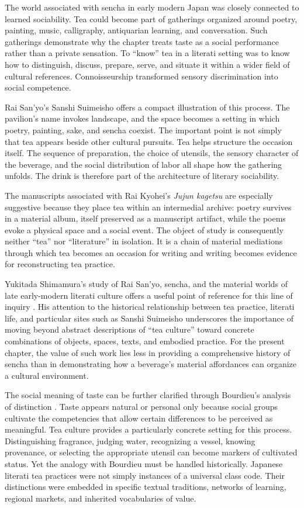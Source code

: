 \documentclass[numbers]{IntechOpen-Book}
\begin{document}
The world associated with sencha in early modern Japan was closely connected to learned sociability. Tea could become part of gatherings organized around poetry, painting, music, calligraphy, antiquarian learning, and conversation. Such gatherings demonstrate why the chapter treats taste as a social performance rather than a private sensation. To ``know'' tea in a literati setting was to know how to distinguish, discuss, prepare, serve, and situate it within a wider field of cultural references. Connoisseurship transformed sensory discrimination into social competence.

Rai San'yo's Sanshi Suimeisho offers a compact illustration of this process. The pavilion's name invokes landscape, and the space becomes a setting in which poetry, painting, sake, and sencha coexist. The important point is not simply that tea appears beside other cultural pursuits. Tea helps structure the occasion itself. The sequence of preparation, the choice of utensils, the sensory character of the beverage, and the social distribution of labor all shape how the gathering unfolds. The drink is therefore part of the architecture of literary sociability.

The manuscripts associated with Rai Kyohei's \textit{Jujun kagetsu} are especially suggestive because they place tea within an intermedial archive: poetry survives in a material album, itself preserved as a manuscript artifact, while the poems evoke a physical space and a social event. The object of study is consequently neither ``tea'' nor ``literature'' in isolation. It is a chain of material mediations through which tea becomes an occasion for writing and writing becomes evidence for reconstructing tea practice.

Yukitada Shimamura's study of Rai San'yo, sencha, and the material worlds of late early-modern literati culture offers a useful point of reference for this line of inquiry \cite{shimamura}. His attention to the historical relationship between tea practice, literati life, and particular sites such as Sanshi Suimeisho underscores the importance of moving beyond abstract descriptions of ``tea culture'' toward concrete combinations of objects, spaces, texts, and embodied practice. For the present chapter, the value of such work lies less in providing a comprehensive history of sencha than in demonstrating how a beverage's material affordances can organize a cultural environment.

The social meaning of taste can be further clarified through Bourdieu's analysis of distinction \cite{bourdieu}. Taste appears natural or personal only because social groups cultivate the competencies that allow certain differences to be perceived as meaningful. Tea culture provides a particularly concrete setting for this process. Distinguishing fragrance, judging water, recognizing a vessel, knowing provenance, or selecting the appropriate utensil can become markers of cultivated status. Yet the analogy with Bourdieu must be handled historically. Japanese literati tea practices were not simply instances of a universal class code. Their distinctions were embedded in specific textual traditions, networks of learning, regional markets, and inherited vocabularies of value.
\end{document}

